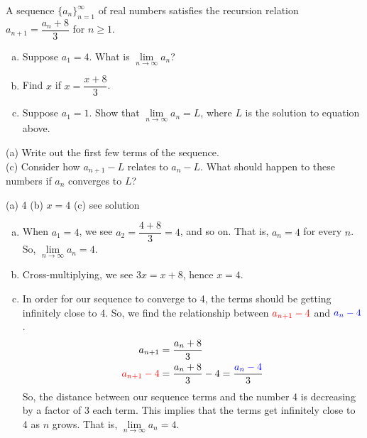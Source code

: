 \begin{question}
A sequence $\big\{a_n\big\}_{n=1}^\infty$ of real numbers satisfies the
recursion relation $a_{n+1} = \dfrac{a_n+8}{3}$ for $n\ge 1$.
\begin{enumerate}[(a)]
\item Suppose $a_1=4$. What is $\lim\limits_{n \to \infty}a_n$?
\item Find $x$ if  $x=\dfrac{x+8}{3}$.
\item Suppose $a_1=1$. Show that $\lim\limits_{n\rightarrow\infty} a_n = L$,
where $L$ is the solution to equation above.
\end{enumerate}
\end{question}

\begin{hint}
(a) Write out the first few terms of the sequence.\\
(c) Consider how $a_{n+1}-L$ relates to $a_{n}-L$. What should happen to these numbers if $a_n$ converges to $L$?
\end{hint}

\begin{answer}
(a) 4 \qquad (b) $x=4$\qquad
(c) see solution
\end{answer}

\begin{solution}
\begin{enumerate}[(a)]
\item When $a_1=4$, we see $a_2=\dfrac{4+8}{3}=4$, and so on. That is, $a_n=4$ for every $n$. So, $\lim\limits_{n \to \infty} a_n=4$.
\item Cross-multiplying, we see $3x=x+8$, hence $x=4$.
\item In order for our sequence to converge to 4, the terms should be getting infinitely close to 4. So, we find the relationship between $\textcolor{red}{a_{n+1}-4}$ and $\textcolor{blue}{a_n-4}$.
\begin{align*}
a_{n+1}&= \frac{a_n+8}{3} \\
\textcolor{red}{a_{n+1}-4}&= \frac{a_n+8}{3} -4=\frac{\textcolor{blue}{a_n-4}}{3}\\
\end{align*}
So, the distance between our sequence terms and the number 4 is decreasing by a factor of 3 each term. This implies that the terms get infinitely close to 4 as $n$ grows. That is, $\lim\limits_{n \to \infty}a_n=4$.
\end{enumerate}

\end{solution}


